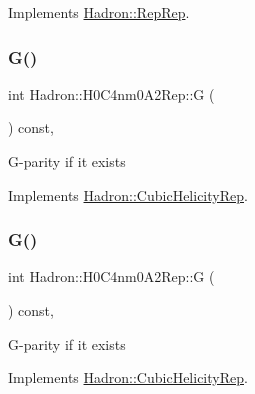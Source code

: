 Implements \mbox{\hyperlink{structHadron_1_1RepRep_a92c8802e5ed7afd7da43ccfd5b7cd92b}{Hadron\+::\+Rep\+Rep}}.

\mbox{\label{structHadron_1_1H0C4nm0A2Rep_a41606c0da3afeabfdf9b865c3335b117}} 
\subsubsection{\texorpdfstring{G()}{G()}\hspace{0.1cm}{\footnotesize\ttfamily [1/3]}}
{\footnotesize\ttfamily int Hadron\+::\+H0\+C4nm0\+A2\+Rep\+::G (\begin{DoxyParamCaption}{ }\end{DoxyParamCaption}) const\hspace{0.3cm}{\ttfamily [inline]}, {\ttfamily [virtual]}}

G-\/parity if it exists 

Implements \mbox{\hyperlink{structHadron_1_1CubicHelicityRep_a50689f42be1e6170aa8cf6ad0597018b}{Hadron\+::\+Cubic\+Helicity\+Rep}}.

\mbox{\label{structHadron_1_1H0C4nm0A2Rep_a41606c0da3afeabfdf9b865c3335b117}} 
\subsubsection{\texorpdfstring{G()}{G()}\hspace{0.1cm}{\footnotesize\ttfamily [2/3]}}
{\footnotesize\ttfamily int Hadron\+::\+H0\+C4nm0\+A2\+Rep\+::G (\begin{DoxyParamCaption}{ }\end{DoxyParamCaption}) const\hspace{0.3cm}{\ttfamily [inline]}, {\ttfamily [virtual]}}

G-\/parity if it exists 

Implements \mbox{\hyperlink{structHadron_1_1CubicHelicityRep_a50689f42be1e6170aa8cf6ad0597018b}{Hadron\+::\+Cubic\+Helicity\+Rep}}.

\mbox{\label{structHadron_1_1H0C4nm0A2Rep_a41606c0da3afeabfdf9b865c3335b117}} 
